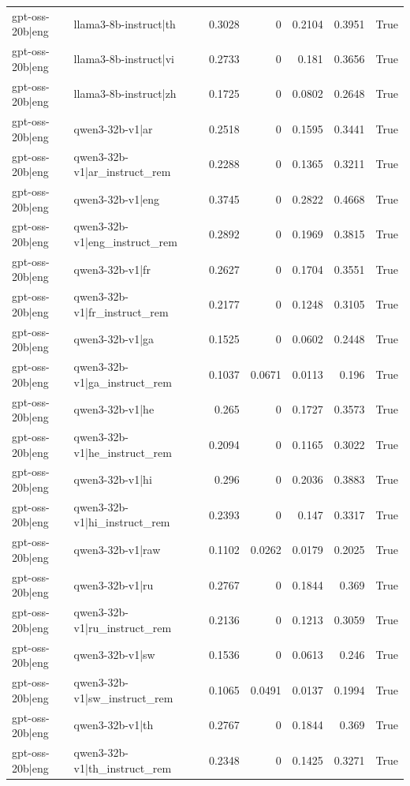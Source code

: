 \begin{table}
\begin{tabular}{l l r r r r l}
gpt-oss-20b|eng & llama3-8b-instruct|th & 0.3028 & 0 & 0.2104 & 0.3951 & True \\
gpt-oss-20b|eng & llama3-8b-instruct|vi & 0.2733 & 0 & 0.181 & 0.3656 & True \\
gpt-oss-20b|eng & llama3-8b-instruct|zh & 0.1725 & 0 & 0.0802 & 0.2648 & True \\
gpt-oss-20b|eng & qwen3-32b-v1|ar & 0.2518 & 0 & 0.1595 & 0.3441 & True \\
gpt-oss-20b|eng & qwen3-32b-v1|ar_instruct_rem & 0.2288 & 0 & 0.1365 & 0.3211 & True \\
gpt-oss-20b|eng & qwen3-32b-v1|eng & 0.3745 & 0 & 0.2822 & 0.4668 & True \\
gpt-oss-20b|eng & qwen3-32b-v1|eng_instruct_rem & 0.2892 & 0 & 0.1969 & 0.3815 & True \\
gpt-oss-20b|eng & qwen3-32b-v1|fr & 0.2627 & 0 & 0.1704 & 0.3551 & True \\
gpt-oss-20b|eng & qwen3-32b-v1|fr_instruct_rem & 0.2177 & 0 & 0.1248 & 0.3105 & True \\
gpt-oss-20b|eng & qwen3-32b-v1|ga & 0.1525 & 0 & 0.0602 & 0.2448 & True \\
gpt-oss-20b|eng & qwen3-32b-v1|ga_instruct_rem & 0.1037 & 0.0671 & 0.0113 & 0.196 & True \\
gpt-oss-20b|eng & qwen3-32b-v1|he & 0.265 & 0 & 0.1727 & 0.3573 & True \\
gpt-oss-20b|eng & qwen3-32b-v1|he_instruct_rem & 0.2094 & 0 & 0.1165 & 0.3022 & True \\
gpt-oss-20b|eng & qwen3-32b-v1|hi & 0.296 & 0 & 0.2036 & 0.3883 & True \\
gpt-oss-20b|eng & qwen3-32b-v1|hi_instruct_rem & 0.2393 & 0 & 0.147 & 0.3317 & True \\
gpt-oss-20b|eng & qwen3-32b-v1|raw & 0.1102 & 0.0262 & 0.0179 & 0.2025 & True \\
gpt-oss-20b|eng & qwen3-32b-v1|ru & 0.2767 & 0 & 0.1844 & 0.369 & True \\
gpt-oss-20b|eng & qwen3-32b-v1|ru_instruct_rem & 0.2136 & 0 & 0.1213 & 0.3059 & True \\
gpt-oss-20b|eng & qwen3-32b-v1|sw & 0.1536 & 0 & 0.0613 & 0.246 & True \\
gpt-oss-20b|eng & qwen3-32b-v1|sw_instruct_rem & 0.1065 & 0.0491 & 0.0137 & 0.1994 & True \\
gpt-oss-20b|eng & qwen3-32b-v1|th & 0.2767 & 0 & 0.1844 & 0.369 & True \\
gpt-oss-20b|eng & qwen3-32b-v1|th_instruct_rem & 0.2348 & 0 & 0.1425 & 0.3271 & True \\

\end{tabular}
\end{table}
